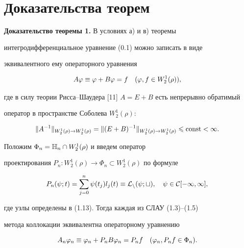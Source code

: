 \section{Доказательства теорем}





{\bf Доказательство теоремы 1.} В условиях а) и в) теоремы 


интегродифференциальное уравнение (0.1) можно записать в виде 


эквивалентного ему операторного уравнения 


\begin{equation}


A\vp \equiv \vp + B\vp = f \quad (\vp,f\in W_2^1(\rho)),


\end{equation}


где в силу теории Рисса--Шаудера [11] $A=E+B$ есть непрерывно обратимый 


оператор в пространстве Соболева $W_2^1(\rho)$:


\begin{equation}


\|A^{-1}\|_{W_2^1(\rho)\to W_2^1(\rho)}=


\|(E+B)^{-1}\|_{W_2^1(\rho)\to W_2^1(\rho)}\lea \const <\infty.


\end{equation}





Положим $\Phi_n = \Bbb H_n \cap W_2^1(\rho)$ и введем оператор 


проектирования $P_n:W_2^1(\rho)\to \Phi_n \subset W_2^1(\rho)$ по формуле


\begin{equation}


P_n(\psi;t) = \suml_{j=0}^n\psi(t_j)l_j(t)\equiv \rL_n(\psi;t),


\quad \psi\in C[-1,1],


\end{equation}


где узлы определены в (1.13). Тогда каждая из СЛАУ (1.3)--(1.5) 


метода коллокации эквивалентна операторному уравнению


\begin{equation}


A_n\vp_n \equiv \vp_n + P_nB\vp_n = P_nf\quad (\vp_n,P_nf\in \Phi_n).


\end{equation}






